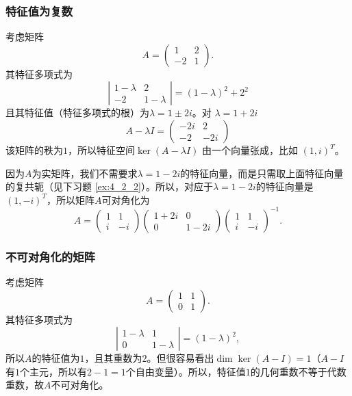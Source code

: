 \subsubsection{特征值为复数}

考虑矩阵
$$A=\left(\begin{array}{cc}1&2\\-2&1\end{array}\right).$$
其特征多项式为
$$\left|\begin{array}{cc}1-\lambda&2\\-2&1-\lambda\end{array}\right|=(1-\lambda)^2+2^2$$
且其特征值（特征多项式的根）为$\lambda=1\pm2i$。对 $\lambda=1+2i$
$$A-\lambda I=\left(\begin{array}{cc}-2i&2\\-2&-2i\end{array}\right)$$
该矩阵的秩为$1$，所以特征空间$\ker (A-\lambda I)$ 由一个向量张成，比如 $(1,i)^T$。

因为$A$为实矩阵，我们不需要求$\lambda=1-2i$的特征向量，而是只需取上面特征向量的复共轭（见下习题 \ref{ex:4_2_2}）。所以，对应于$\lambda=1-2i$的特征向量是 $(1,-i)^{T}$，所以矩阵$A$可对角化为
$$A=\left(\begin{array}{cc}1&1\\i&-i\end{array}\right)\left(\begin{array}{cc}1+2i&0\\0&1-2i\end{array}\right)\left(\begin{array}{cc}1&1\\i&-i\end{array}\right)^{-1}.$$

\subsubsection{不可对角化的矩阵}

考虑矩阵
$$A=\left(\begin{array}{cc}1&1\\0&1\end{array}\right).$$
其特征多项式为
$$\left|\begin{array}{cc}1-\lambda&1\\0&1-\lambda\end{array}\right|=(1-\lambda)^2,$$
所以$A$的特征值为$1$，且其重数为$2$。但很容易看出$\dim\ker(A-I)=1$（$A-I$有$1$个主元，所以有$2-1=1$个自由变量）。所以，特征值$1$的几何重数不等于代数重数，故$A$不可对角化。

